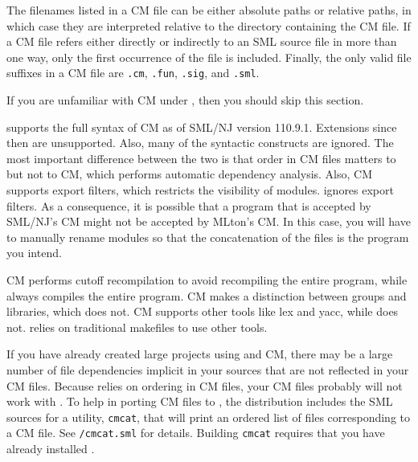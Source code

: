 The filenames listed in a CM file can be either absolute paths or relative
paths, in which case they are interpreted relative to the directory containing
the CM file.  If a CM file refers either directly or indirectly to an SML source
file in more than one way, only the first occurrence of the file is included.
Finally, the only valid file suffixes in a CM file are {\tt .cm}, {\tt .fun},
{\tt .sig}, and {\tt .sml}.
%

If you are unfamiliar with CM under {\smlnj}, then you should skip this
section.

{\mlton} supports the full syntax of CM as of SML/NJ version 110.9.1.
Extensions since then are unsupported.  Also, many of the syntactic
constructs are ignored.  The most important difference between the two is that
order in CM files matters to {\mlton} but not to CM, which performs automatic
dependency analysis.  Also, CM supports export filters, which restricts the
visibility of modules.  {\mlton} ignores export filters.  As a consequence, it
is possible that a program that is accepted by SML/NJ's CM might not be accepted
by MLton's CM.  In this case, you will have to manually rename modules so that
the concatenation of the files is the program you intend.

CM performs cutoff recompilation to avoid recompiling the entire program, while
{\mlton} always compiles the entire program.  CM makes a distinction between
groups and libraries, which {\mlton} does not.  CM supports other tools like lex
and yacc, while {\mlton} does not.  {\mlton} relies on traditional makefiles to
use other tools.
%

If you have already created large projects using {\smlnj} and CM, there may be a
large number of file dependencies implicit in your sources that are not
reflected in your CM files.  Because {\mlton} relies on ordering in CM files,
your CM files probably will not work with {\mlton}.  To help in porting CM files
to {\mlton}, the {\mlton} distribution includes the SML sources for a
utility, {\tt cmcat}, that will print an ordered list of files corresponding to
a CM file.  See {\tt \doc/cmcat.sml} for details.  Building {\tt cmcat}
requires that you have already installed {\smlnj}.
